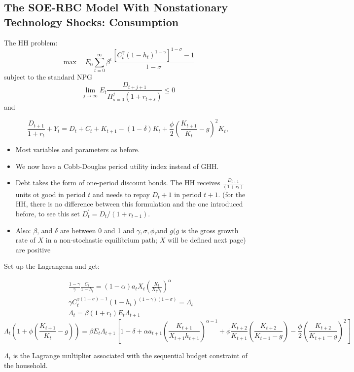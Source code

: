 \subsection{The SOE-RBC Model With Nonstationary Technology Shocks: Consumption}

The HH problem:
\[
\max \quad E_0\sum_{t=0}^\infty\beta^t\frac{[C_t^\gamma(1-h_t)^{1-\gamma}]^{1-\sigma}-1}{1-\sigma}
\]
subject to the standard NPG $$\lim_{j\to\infty}E_t\frac{D_{t+j+1}}{\Pi_{s=0}^j(1+r_{t+s})}\leq0$$ and

$$\frac{D_{t+1}}{1+r_t}+Y_t=D_t+C_t+K_{t+1}-(1-\delta)K_t+\frac\phi2\left(\frac{K_{t+1}}{K_t}-g\right)^2K_t,$$

\begin{itemize}
    \item Most variables and parameters as before.
    \item We now have a Cobb-Douglas period utility index instead of GHH. 
    \item Debt takes the form of one-period discount bonds. The HH receives $\frac{D_{t+1}}{(1+r_t)}$ units ot
    good in period $t$ and needs to repay $D_t+1$ in period $t+1.$ (for the HH, there is no difference between this formulation and the one introduced before, to see this set $D_t^{\prime}=D_t/(1+r_{t-1}).$
    \item Also: $\beta$, and $\delta$ are between 0 and 1 and $\gamma,\sigma,\phi$,and $g(g$ is the gross growth rate
    of $X$ in a non-stochastic equilibrium path; $X$ will be defined next page) are
positive
\end{itemize}

Set up the Lagrangean and get:

\begin{align*}
    & \frac{1-\gamma}\gamma\frac{C_t}{1-h_t}=(1-\alpha)a_tX_t\left(\frac{K_t}{X_th_t}\right)^\alpha \\
    & \gamma C_t^{\gamma(1-\sigma)-1}(1-h_t)^{(1-\gamma)(1-\sigma)}=\Lambda_t\\
    & \Lambda_t=\beta(1+r_t)E_t\Lambda_{t+1}
\end{align*}
\[
\Lambda_{t}\left(1+\phi\left(\frac{K_{t+1}}{K_{t}}-g\right)\right)=\beta E_{t}\Lambda_{t+1}\left[1-\delta+\alpha a_{t+1}\left(\frac{K_{t+1}}{X_{t+1}h_{t+1}}\right)^{\alpha-1}+\phi\frac{K_{t+2}}{K_{t+1}}\left(\frac{K_{t+2}}{K_{t+1}-g}\right)-\frac{\phi}{2}\left(\frac{K_{t+2}}{K_{t+1}-g}\right)^{2}\right]
\]

$\Lambda_t$ is the Lagrange multiplier associated with the sequential budget
constraint of the household.

